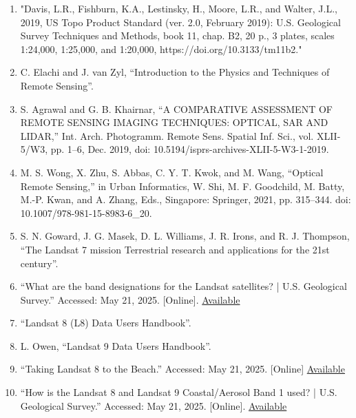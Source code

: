 \documentclass{article}
\begin{document}
\begin{enumerate}
    \item{"Davis, L.R., Fishburn, K.A., Lestinsky, H., Moore, L.R., and Walter, J.L., 2019, US Topo Product Standard (ver. 2.0, February 2019): U.S. Geological Survey Techniques and Methods, book 11, chap. B2, 20 p., 3 plates, scales 1:24,000, 1:25,000, and 1:20,000, https://doi.org/10.3133/tm11b2."}

    \item{C. Elachi and J. van Zyl, “Introduction to the Physics and Techniques of Remote Sensing”.}

    \item{S. Agrawal and G. B. Khairnar, “A COMPARATIVE ASSESSMENT OF REMOTE SENSING IMAGING TECHNIQUES: OPTICAL, SAR AND LIDAR,” Int. Arch. Photogramm. Remote Sens. Spatial Inf. Sci., vol. XLII-5/W3, pp. 1–6, Dec. 2019, doi: 10.5194/isprs-archives-XLII-5-W3-1-2019.}

    \item{M. S. Wong, X. Zhu, S. Abbas, C. Y. T. Kwok, and M. Wang, “Optical Remote Sensing,” in Urban Informatics, W. Shi, M. F. Goodchild, M. Batty, M.-P. Kwan, and A. Zhang, Eds., Singapore: Springer, 2021, pp. 315–344. doi: 10.1007/978-981-15-8983-6_20.}

    \item{S. N. Goward, J. G. Masek, D. L. Williams, J. R. Irons, and R. J. Thompson, “The Landsat 7 mission Terrestrial research and applications for the 21st century”.}

    \item{“What are the band designations for the Landsat satellites? | U.S. Geological Survey.” Accessed: May 21, 2025. [Online]. \href{https://www.usgs.gov/faqs/what-are-band-designations-landsat-satellites}{Available}}

    \item{“Landsat 8 (L8) Data Users Handbook”.}

    \item{L. Owen, “Landsat 9 Data Users Handbook”.}

    \item{“Taking Landsat 8 to the Beach.” Accessed: May 21, 2025. [Online] \href{https://earthobservatory.nasa.gov/images/84218/taking-landsat-8-to-the-beach}{Available}}

    \item{“How is the Landsat 8 and Landsat 9 Coastal/Aerosol Band 1 used? | U.S. Geological Survey.” Accessed: May 21, 2025. [Online]. \href{https://www.usgs.gov/faqs/how-landsat-8-and-landsat-9-coastalaerosol-band-1-used}{Available}}

\end{enumerate}

\end{document}
